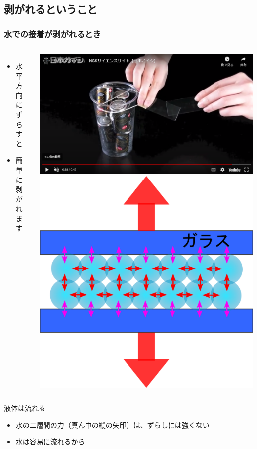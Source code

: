 \documentclass[unicode,12pt]{beamer}%
\begin{document}
\subsection{剥がれるということ}
\begin{frame}
	\frametitle{水での接着が剥がれるとき}
		\begin{columns}[T, onlytextwidth]
				\begin{itemize}
					\item 水平方向にずらすと
					\item 簡単に剥がれます
				\end{itemize}

				\centering
			\includegraphics[width=\textwidth]{glass_water4.png}
			\centering
			\includegraphics[width=.7\textwidth]{glass_water.png}
		\end{columns}
		\begin{exampleblock}{液体は流れる}
			\begin{itemize}
				\item 水の二層間の力（真ん中の縦の矢印）は、ずらしには強くない
				\item 水は容易に流れるから
			\end{itemize}
		\end{exampleblock}
\end{frame}
\end{document}
